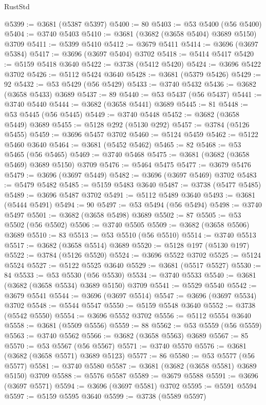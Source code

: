 \begin{lexlean}{RustStd}
\begin{coremodule}
@5399 := @3681 (@5387 @5397)
@5400 := 80
@5403 := @53 @5400 (@56 @5400)
@5404 := @3740 @5403
@5410 := @3681 (@3682 (@3658 @5404) @3689 @5150) @3709
@5411 := @5399 @5410
@5412 := @3679 @5411
@5414 := @3696 (@3697 @5384)
@5417 := @3696 (@3697 @5404) @3702
@5418 := @5414 @5417
@5420 := @5159 @5418 @3640
@5422 := @3738 (@5412 @5420)
@5424 := @3696 @5422 @3702
@5426 := @5112 @5424 @3640
@5428 := @3681 (@5379 @5426)
@5429 := 92
@5432 := @53 @5429 (@56 @5429)
@5433 := @3740 @5432
@5436 := @3682 (@3658 @5433) @3689
@5437 := 89
@5440 := @53 @5437 (@56 @5437)
@5441 := @3740 @5440
@5444 := @3682 (@3658 @5441) @3689
@5445 := 81
@5448 := @53 @5445 (@56 @5445)
@5449 := @3740 @5448
@5452 := @3682 (@3658 @5449) @3689
@5455 := @5128 @292 (@5130 @292)
@5457 := @3784 (@5126 @5455)
@5459 := @3696 @5457 @3702
@5460 := @5124 @5459
@5462 := @5122 @5460 @3640
@5464 := @3681 (@5452 @5462)
@5465 := 82
@5468 := @53 @5465 (@56 @5465)
@5469 := @3740 @5468
@5475 := @3681 (@3682 (@3658 @5469) @3689 @5150) @3709
@5476 := @5464 @5475
@5477 := @3679 @5476
@5479 := @3696 (@3697 @5449)
@5482 := @3696 (@3697 @5469) @3702
@5483 := @5479 @5482
@5485 := @5159 @5483 @3640
@5487 := @3738 (@5477 @5485)
@5489 := @3696 @5487 @3702
@5491 := @5112 @5489 @3640
@5493 := @3681 (@5444 @5491)
@5494 := 90
@5497 := @53 @5494 (@56 @5494)
@5498 := @3740 @5497
@5501 := @3682 (@3658 @5498) @3689
@5502 := 87
@5505 := @53 @5502 (@56 @5502)
@5506 := @3740 @5505
@5509 := @3682 (@3658 @5506) @3689
@5510 := 83
@5513 := @53 @5510 (@56 @5510)
@5514 := @3740 @5513
@5517 := @3682 (@3658 @5514) @3689
@5520 := @5128 @197 (@5130 @197)
@5522 := @3784 (@5126 @5520)
@5524 := @3696 @5522 @3702
@5525 := @5124 @5524
@5527 := @5122 @5525 @3640
@5529 := @3681 (@5517 @5527)
@5530 := 84
@5533 := @53 @5530 (@56 @5530)
@5534 := @3740 @5533
@5540 := @3681 (@3682 (@3658 @5534) @3689 @5150) @3709
@5541 := @5529 @5540
@5542 := @3679 @5541
@5544 := @3696 (@3697 @5514)
@5547 := @3696 (@3697 @5534) @3702
@5548 := @5544 @5547
@5550 := @5159 @5548 @3640
@5552 := @3738 (@5542 @5550)
@5554 := @3696 @5552 @3702
@5556 := @5112 @5554 @3640
@5558 := @3681 (@5509 @5556)
@5559 := 88
@5562 := @53 @5559 (@56 @5559)
@5563 := @3740 @5562
@5566 := @3682 (@3658 @5563) @3689
@5567 := 85
@5570 := @53 @5567 (@56 @5567)
@5571 := @3740 @5570
@5576 := @3681 (@3682 (@3658 @5571) @3689 @5123)
@5577 := 86
@5580 := @53 @5577 (@56 @5577)
@5581 := @3740 @5580
@5587 := @3681 (@3682 (@3658 @5581) @3689 @5150) @3709
@5588 := @5576 @5587
@5589 := @3679 @5588
@5591 := @3696 (@3697 @5571)
@5594 := @3696 (@3697 @5581) @3702
@5595 := @5591 @5594
@5597 := @5159 @5595 @3640
@5599 := @3738 (@5589 @5597)

\end{coremodule}
\end{lexlean}
